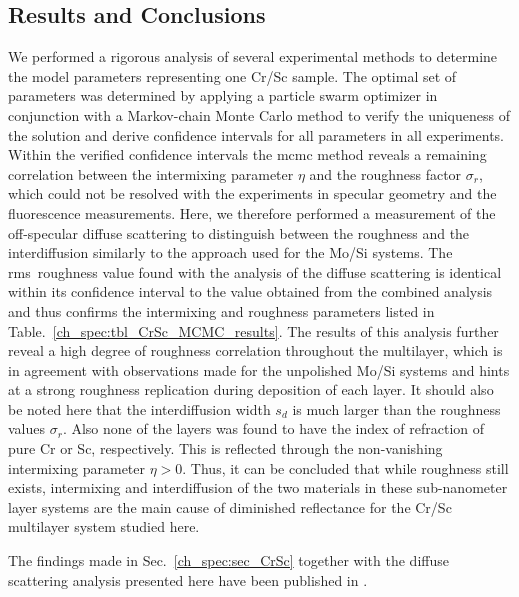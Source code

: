 \subsection{Results and Conclusions}
We performed a rigorous analysis of several experimental methods to determine 
the model parameters representing one Cr/Sc sample. The optimal set of 
parameters was determined by applying a particle swarm optimizer in conjunction 
with a Markov-chain Monte Carlo method to verify the uniqueness of the solution 
and derive confidence intervals for all parameters in all experiments. Within the verified confidence intervals the \gls{mcmc} method reveals a remaining 
correlation between the intermixing parameter $\eta$ and the roughness factor $\sigma_r$, which 
could not be resolved with the experiments in specular geometry and the fluorescence measurements. Here, we therefore 
performed a measurement of the off-specular diffuse scattering to distinguish 
between the roughness and the interdiffusion similarly to the approach used for the Mo/Si systems. The \gls{rms}~roughness value found with the analysis of the diffuse scattering is identical within its confidence interval to the value obtained from the combined analysis and thus confirms the intermixing and roughness parameters listed in Table.~\ref{ch_spec:tbl_CrSc_MCMC_results}. The results of this analysis further reveal a high degree of roughness correlation throughout the multilayer, which is in agreement with observations made for the unpolished Mo/Si systems and hints at a strong roughness replication during deposition of each layer. It should also be noted here that the interdiffusion width 
$s_d$ is much larger than the roughness values $\sigma_r$. Also none of the 
layers was found to have the index of refraction of pure Cr or Sc, 
respectively. This is reflected through the non-vanishing intermixing parameter 
$\eta>0$. Thus, it can be concluded that while roughness still exists, 
intermixing and interdiffusion of the two materials in these sub-nanometer layer systems are the main cause of diminished reflectance for the Cr/Sc multilayer system studied here.

The findings made in Sec.~\ref{ch_spec:sec_CrSc} together with the diffuse scattering analysis presented here have been published in .